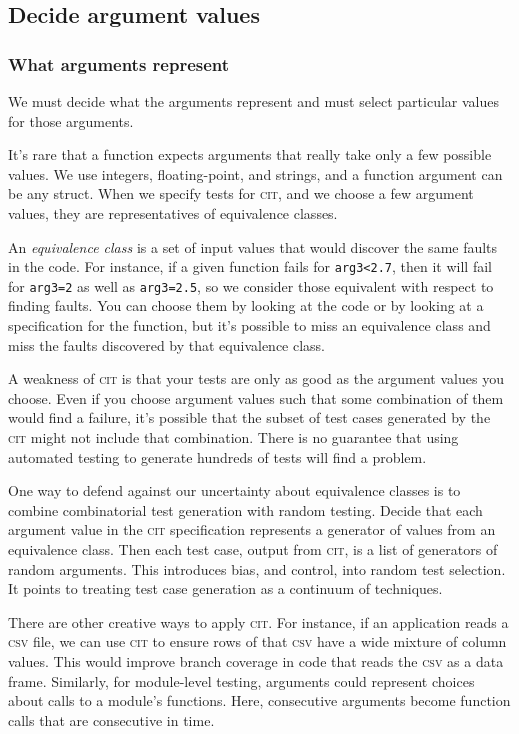 \documentclass{juliacon}
\newcommand{\cit}{\textsc{cit}\xspace}
\newcommand{\csv}{\textsc{csv}\xspace}
\begin{document}
\subsection{Decide argument values}

\subsubsection{What arguments represent}
We must decide what the arguments represent and must select particular values for those arguments.

\vskip 6pt
It's rare that a function expects arguments that really take only a few possible values. We use integers, floating-point, and strings, and a function argument can be any struct. When we specify tests for \cit, and we choose a few argument values, they are representatives of equivalence classes.

\vskip 6pt
An \emph{equivalence class} is a set of input values that would discover the same faults in the code. For instance, if a given function fails for \verb|arg3<2.7|, then it will fail for \verb|arg3=2| as well as \verb|arg3=2.5|, so we consider those equivalent with respect to finding faults. You can choose them by looking at the code or by looking at a specification for the function, but it's possible to miss an equivalence class and miss the faults discovered by that equivalence class.

\vskip 6pt
A weakness of \cit is that your tests are only as good as the argument values you choose. Even if you choose argument values such that some combination of them would find a failure, it's possible that the subset of test cases generated by the \cit might not include that combination. There is no guarantee that using automated testing to generate hundreds of tests will find a problem.

\vskip 6pt
One way to defend against our uncertainty about equivalence classes is to combine combinatorial test generation with random testing. Decide that each argument value in the \cit specification represents a generator of values from an equivalence class. Then each test case, output from \cit, is a list of generators of random arguments. This introduces bias, and control, into random test selection. It points to treating test case generation as a continuum of techniques.

\vskip 6pt
There are other creative ways to apply \cit. For instance, if an application reads a \csv file, we can use \cit to ensure rows of that \csv have a wide mixture of column values. This would improve branch coverage in code that reads the \csv as a data frame. Similarly, for module-level testing, arguments could represent choices about calls to a module's functions. Here, consecutive arguments become function calls that are consecutive in time.
\end{document}

